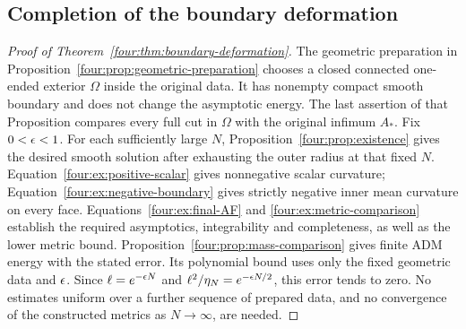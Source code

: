 \subsection{Completion of the boundary deformation}

\begin{proof}[Proof of Theorem~\ref{four:thm:boundary-deformation}]
The geometric preparation in
Proposition~\ref{four:prop:geometric-preparation} chooses a closed connected
one-ended exterior $\Omega$ inside the original data. It has nonempty
compact smooth boundary and does not change the asymptotic energy.
The last assertion of that Proposition compares every full cut in $\Omega$
with the original infimum $A_*$. Fix $0<\epsilon<1$. For each sufficiently
large $N$, Proposition~\ref{four:prop:existence} gives the desired smooth
solution after exhausting the outer radius at that fixed $N$.
Equation~\eqref{four:ex:positive-scalar} gives nonnegative scalar curvature;
Equation~\eqref{four:ex:negative-boundary} gives strictly negative inner
mean curvature on every face. Equations~\eqref{four:ex:final-AF} and
\eqref{four:ex:metric-comparison} establish the required asymptotics,
integrability and completeness, as well as the lower metric bound.
Proposition~\ref{four:prop:mass-comparison} gives finite ADM energy with
the stated error. Its polynomial bound uses only the fixed geometric
data and $\epsilon$. Since
$\ell=e^{-\epsilon N}$ and $\ell^2/\eta_N=e^{-\epsilon N/2}$, this error
tends to zero. No estimates uniform over a further sequence of prepared
data, and no convergence of the constructed metrics as $N\to\infty$,
are needed.
\end{proof}
